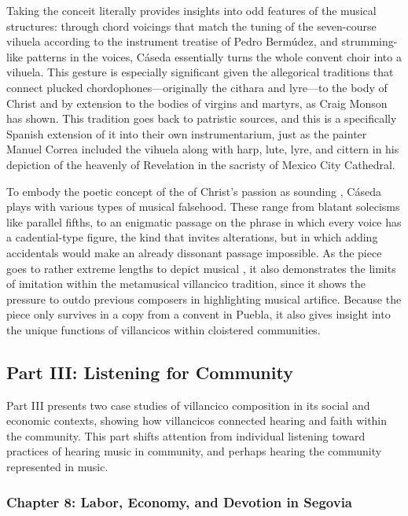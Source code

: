 \documentclass[tt]{vcbook-proposal}
\begin{document}
Taking the conceit literally provides insights into odd features of the musical structures: through chord voicings that match the tuning of the seven-course vihuela according to the instrument treatise of Pedro Bermúdez, and strumming-like patterns in the voices, Cáseda essentially turns the whole convent choir into a vihuela.
This gesture is especially significant given the allegorical traditions that connect plucked chordophones---originally the cithara and lyre---to the body of Christ and by extension to the bodies of virgins and martyrs, as Craig Monson has shown.
This tradition goes back to patristic sources, and this is a specifically Spanish extension of it into their own instrumentarium, just as the painter Manuel Correa included the vihuela along with harp, lute, lyre, and cittern in his depiction of the heavenly  of Revelation in the sacristy of Mexico City Cathedral.

To embody the poetic concept of the  of Christ's passion as sounding , Cáseda plays with various types of musical falsehood.
These range from blatant solecisms like parallel fifths, to an enigmatic passage on the phrase  in which every voice has a cadential-type figure, the kind that invites  alterations, but in which adding accidentals would make an already dissonant passage impossible.
As the piece goes to rather extreme lengths to depict musical , it also demonstrates the limits of imitation within the metamusical villancico tradition, since it shows the pressure to outdo previous composers in highlighting musical artifice.
Because the piece only survives in a copy from a convent in Puebla, it also gives insight into the unique functions of villancicos within cloistered communities.


\subsection{Part III: Listening for Community}

Part III presents two case studies of villancico composition in its social and economic contexts, showing how villancicos connected hearing and faith within the community.
This part shifts attention from individual listening toward practices of hearing music in community, and perhaps hearing the community represented in music.

\subsubsection{Chapter 8: Labor, Economy, and Devotion in Segovia}
\end{document}
